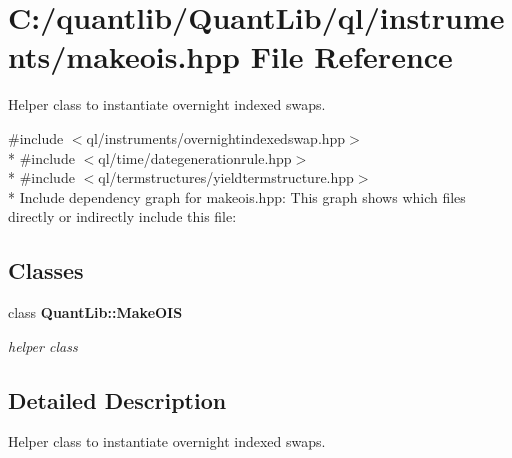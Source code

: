\section{C\+:/quantlib/\+Quant\+Lib/ql/instruments/makeois.hpp File Reference}
\label{makeois_8hpp}


Helper class to instantiate overnight indexed swaps.  


{\ttfamily \#include $<$ql/instruments/overnightindexedswap.\+hpp$>$}\\*
{\ttfamily \#include $<$ql/time/dategenerationrule.\+hpp$>$}\\*
{\ttfamily \#include $<$ql/termstructures/yieldtermstructure.\+hpp$>$}\\*
Include dependency graph for makeois.\+hpp\+:
This graph shows which files directly or indirectly include this file\+:
\subsection*{Classes}
\begin{DoxyCompactItemize}
\item 
class {\bf Quant\+Lib\+::\+Make\+O\+IS}
\begin{DoxyCompactList}\small\item\em helper class \end{DoxyCompactList}\end{DoxyCompactItemize}


\subsection{Detailed Description}
Helper class to instantiate overnight indexed swaps. 

